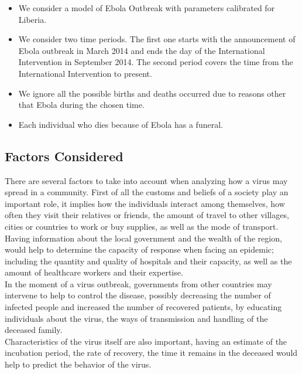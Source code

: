 \begin{itemize}
\item We consider a model of Ebola Outbreak with parameters calibrated for Liberia.
\item We consider two time periods. The first one starts with the announcement of Ebola outbreak in March 2014 and ends the day of the International Intervention in September 2014. The second period covers the time from the International Intervention to present.
\item We ignore all the possible births and deaths occurred due to reasons other that Ebola during the chosen time. 
\item Each individual who dies because of Ebola has a funeral.
\end{itemize}


\subsection{Factors Considered}
There are several factors to take into account when analyzing how a virus may spread in a community. First of all the customs and beliefs of a society play an important role, it implies how the individuals interact among themselves, how often they visit their relatives or friends, the amount of travel to other villages, cities or countries to work or buy supplies, as well as the mode of transport.\\
Having information about the local government and the wealth of the region, would help to determine the capacity of response when facing an epidemic; including the quantity and quality of hospitals and their capacity, as well as the amount of healthcare workers and their expertise.\\
In the moment of a virus outbreak, governments from other countries may intervene to help to control the disease, possibly decreasing the number of infected people and increased the number of recovered patients, by educating individuals about the virus, the ways of transmission and handling of the deceased family. \\
Characteristics of the virus itself are also important, having an estimate of the incubation period, the rate of recovery, the time it remains in the deceased would help to predict the behavior of the virus.\\


